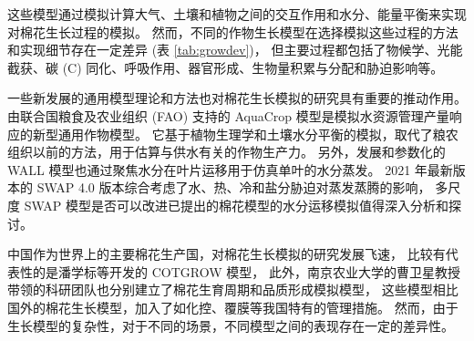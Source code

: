 这些模型通过模拟计算大气、土壤和植物之间的交互作用和水分、能量平衡来实现对棉花生长过程的模拟。%
然而，不同的作物生长模型在选择模拟这些过程的方法和实现细节存在一定差异 (表 \ref{tab:growdev})\cite{thorp2014}，%
但主要过程都包括了物候学、光能截获、碳 (C) 同化、呼吸作用、器官形成、生物量积累与分配和胁迫影响等。

一些新发展的通用模型理论和方法也对棉花生长模拟的研究具有重要的推动作用。
由联合国粮食及农业组织 (FAO) 支持的 AquaCrop 模型是模拟水资源管理产量响应的新型通用作物模型\cite{tan2018}。
它基于植物生理学和土壤水分平衡的模拟，取代了粮农组织以前的方法，用于估算与供水有关的作物生产力。
另外，发展和参数化的 WALL 模型也通过聚焦水分在叶片运移用于仿真单叶的水分蒸发\cite{pachepsky2009}。
2021 年最新版本的 SWAP 4.0 版本\cite{swap2021}综合考虑了水、热、冷和盐分胁迫对蒸发蒸腾的影响，%
多尺度 SWAP 模型是否可以改进已提出的棉花模型的水分运移模拟值得深入分析和探讨。

中国作为世界上的主要棉花生产国，对棉花生长模拟的研究发展飞速，%
比较有代表性的是潘学标等开发的 COTGROW\cite{pan1996} 模型，%
此外，南京农业大学的曹卫星教授带领的科研团队\cite{zhang2003,ma2004,chen2006}也分别建立了棉花生育周期和品质形成模拟模型，%
这些模型相比国外的棉花生长模型，加入了如化控、覆膜等我国特有的管理措施。%
然而，由于生长模型的复杂性，对于不同的场景，不同模型之间的表现存在一定的差异性。

